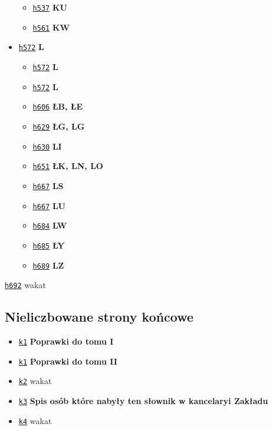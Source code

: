 \documentclass[12]{mwart}
\begin{document}
\begin{itemize}
\begin{itemize}
  \item \href{\paii{2}{545}}{\texttt{h537}}  \textbf{KU}
  \item \href{\paii{2}{569}}{\texttt{h561}}  \textbf{KW}
  \end{itemize}
\item \href{\paii{2}{580}}{\texttt{h572}}  \textbf{L}
  \begin{itemize}
  \item \href{\paii{2}{580}}{\texttt{h572}}  \textbf{L}
  \item \href{\paii{2}{580}}{\texttt{h572}}  \textbf{L}
  \item \href{\paii{2}{614}}{\texttt{h606}}  \textbf{ŁB, ŁE}
  \item \href{\paii{2}{637}}{\texttt{h629}}  \textbf{ŁG, LG}
  \item \href{\paii{2}{638}}{\texttt{h630}}  \textbf{LI}
  \item \href{\paii{2}{659}}{\texttt{h651}}  \textbf{ŁK, LN, LO}
  \item \href{\paii{2}{675}}{\texttt{h667}} \textbf{LS}
  \item \href{\paii{2}{675}}{\texttt{h667}} \textbf{LU}
  \item \href{\paii{2}{692}}{\texttt{h684}} \textbf{LW}
  \item \href{\paii{2}{693}}{\texttt{h685}} \textbf{ŁY}
  \item \href{\paii{2}{697}}{\texttt{h689}} \textbf{LZ}
  \end{itemize}
\end{itemize}
\href{\paii{2}{700}}{\texttt{h692}} wakat

\subsection{Nieliczbowane strony końcowe}
\label{sec:niel-strony-kocowe-1}

\begin{itemize}
\item \href{\paii{2}{701}}{\texttt{k1}} \textbf{Poprawki do tomu I}
\item \href{\paii{2}{701}}{\texttt{k1}} \textbf{Poprawki do tomu II}
\item \href{\paii{2}{702}}{\texttt{k2}} wakat
\item \href{\paii{2}{703}}{\texttt{k3}} \textbf{Spis osób które nabyły ten słownik w kancelaryi Zakładu}
\item \href{\paii{2}{704}}{\texttt{k4}} wakat
\end{itemize}
\end{document}
